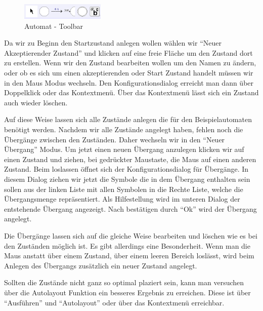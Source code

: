 \begin{figure}[h]
\begin{center}
\includegraphics[width=4cm]{images/machine_toolbar.png}
\caption{Automat - Toolbar}
\end{center}
\end{figure}

Da wir zu Beginn den Startzustand anlegen wollen wählen wir "`Neuer Akzeptierender
Zustand"' und klicken auf eine freie Fläche um den Zustand dort zu erstellen.
Wenn wir den Zustand bearbeiten wollen um den Namen zu ändern, oder ob es sich
um einen akzeptierenden oder Start Zustand handelt müssen wir in den Maus Modus
wechseln. Den Konfigurationsdialog erreicht man dann über Doppelklick oder das
Kontextmenü. Über das Kontextmenü lässt sich ein Zustand auch wieder
löschen.\vspace{10pt}

Auf diese Weise lassen sich alle Zustände anlegen die für den Beispielautomaten
benötigt werden. Nachdem wir alle Zustände angelegt haben, fehlen noch die
Übergänge zwischen den Zuständen. Daher wechseln wir in den "`Neuer Übergang"'
Modus. Um jetzt einen neuen Übergang anzulegen klicken wir auf einen Zustand 
und ziehen, bei gedrückter Maustaste, die Maus auf einen anderen Zustand. Beim
loslassen öffnet sich der Konfigurationsdialog für Übergänge. In diesem Dialog 
ziehen wir jetzt die Symbole die in dem Übergang enthalten sein sollen aus der 
linken Liste mit allen Symbolen in die Rechte Liste, welche die Übergangsmenge
repräsentiert. Als Hilfestellung wird im unteren Dia\-log der entstehende
Übergang angezeigt. Nach bestätigen durch "`Ok"' wird der Übergang angelegt.\vspace{10pt}

Die Übergänge lassen sich auf die gleiche Weise bearbeiten und löschen wie
es bei den Zuständen möglich ist. Es gibt allerdings eine Besonderheit. Wenn
man die Maus anstatt über einem Zustand, über einem leeren Bereich
loslässt, wird beim Anlegen des Übergangs zusätzlich ein neuer Zustand
angelegt.\vspace{10pt}

Sollten die Zustände nicht ganz so optimal plaziert sein, kann man
versuchen über die Autolayout Funktion ein besseres Ergebnis zu
erreichen. Diese ist über "`Ausführen"' und "`Autolayout"' oder über
das Kontextmenü erreichbar.\vspace{10pt}

